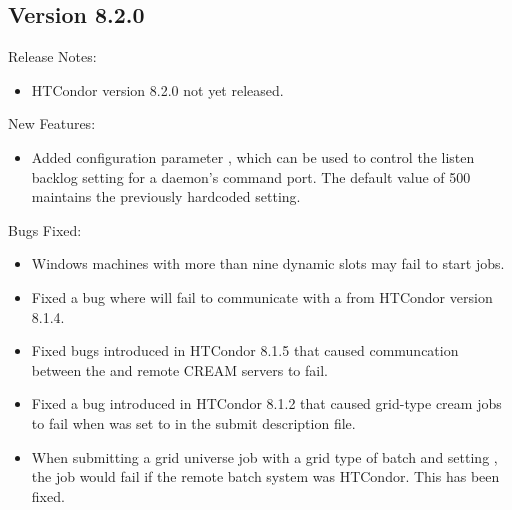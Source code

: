 \subsection*{\label{sec:New-8-2-0}Version 8.2.0}

\noindent Release Notes:

\begin{itemize}

\item HTCondor version 8.2.0 not yet released.

\end{itemize}


\noindent New Features:

\begin{itemize}

\item Added configuration parameter , which
can be used to control the listen backlog setting for a daemon's command
port.
The default value of 500 maintains the previously hardcoded setting.

\end{itemize}

\noindent Bugs Fixed:

\begin{itemize}

\item Windows machines with more than nine dynamic slots may fail to start jobs.

\item Fixed a bug where  will fail to communicate with a
 from HTCondor version 8.1.4.

\item Fixed bugs introduced in HTCondor 8.1.5 that caused communcation
between the  and remote CREAM servers to fail.

\item Fixed a bug introduced in HTCondor 8.1.2 that caused grid-type
cream jobs to fail when  was set to 
in the submit description file.

\item When submitting a grid universe job with a grid type of batch and
setting , the job would fail if the remote
batch system was HTCondor. This has been fixed.

\end{itemize}

